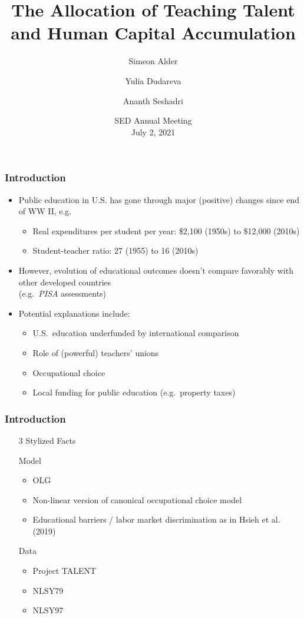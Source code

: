 \documentclass[11pt]{beamer}
\title{The Allocation of Teaching Talent and Human Capital Accumulation}
\author[shortname]{Simeon Alder\inst{1} \and Yulia Dudareva\inst{1} \and Ananth Seshadri\inst{1}}
\institute[shortinst]{\inst{1} University of Wisconsin--Madison}
\date{SED Annual Meeting \\ July 2, 2021}
\begin{document}
\begin{frame}
\titlepage
\end{frame}

\begin{frame}
\frametitle{Introduction}
\begin{itemize}
  \item Public education in U.S. has gone through major (positive) changes since end of WW II, e.g.
\begin{itemize}
  \item Real expenditures per student per year: \$2,100 (1950s) to \$12,000 (2010s)
  \item Student-teacher ratio: 27 (1955) to 16 (2010s)
\end{itemize}

  \item However, evolution of educational outcomes doesn't compare favorably with other developed countries\\(e.g.~{\it PISA} assessments)

  \item Potential explanations include:
\begin{itemize}
  \item U.S.~education underfunded by international comparison
  \item Role of (powerful) teachers' unions \pause
  \item \alert{Occupational choice} \pause
   \item Local funding for public education (e.g.~property taxes)
\end{itemize}

\end{itemize}

\end{frame}

\begin{frame}
\frametitle{Introduction}
\begin{adjustwidth}{4em}{0em}
\begin{itemize}
  \item[3 Stylized Facts]
  \item[Model]
  \begin{itemize}
  \item OLG
  \item Non-linear version of canonical occupational choice model
  \item Educational barriers / labor market discrimination as in Hsieh et al. (2019)
\end{itemize}
\item[Data]
\begin{itemize}
  \item Project TALENT
  \item NLSY79
  \item NLSY97
\end{itemize}
\end{itemize}
\end{adjustwidth}
\end{frame}
\end{document}

